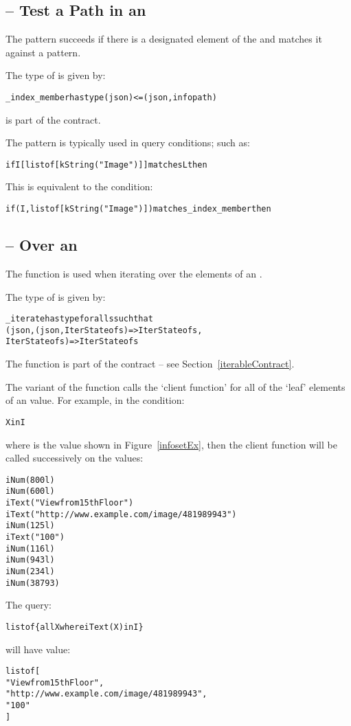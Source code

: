 \subsection{ -- Test a Path in an }

The  pattern succeeds if there is a designated element of the  and matches it against a pattern.

The type of  is given by:
\begin{alltt}
\_index\_member has type (json)<=(json,infopath)
\end{alltt}
 is part of the  contract.

The  pattern is typically used in query conditions; such as:
\begin{alltt}
if I[list of [kString("Image")]] matches L then
\end{alltt}
This is equivalent to the condition:
\begin{alltt}
if (I,list of [kString("Image")]) matches \_index\_member then
\end{alltt}

\subsection{ -- Over an }

The  function is used when iterating over the elements of an . 

The type of  is given by:
\begin{alltt}
\_iterate has type for all s such that
  (json,(json,IterState of s)=>IterState of s,
   IterState of s) => IterState of s
\end{alltt}
The  function is part of the  contract -- see Section~\vref{iterableContract}.

The  variant of the  function calls the `client function' for all of the `leaf' elements of an  value. For example, in the condition:
\begin{alltt}
X in I
\end{alltt}
where  is the  value shown in Figure~\vref{infosetEx}, then the client function will be called successively on the  values:
\begin{alltt}
iNum(800l)
iNum(600l)
iText("View from 15th Floor")
iText("http://www.example.com/image/481989943")
iNum(125l)
iText("100")
iNum(116l)
iNum(943l)
iNum(234l)
iNum(38793)
\end{alltt}
The query:
\begin{alltt}
list of \{ all X where iText(X) in I \}
\end{alltt}
will have value:
\begin{alltt}
list of [ 
  "View from 15th Floor",
  "http://www.example.com/image/481989943",
  "100"
]
\end{alltt}

